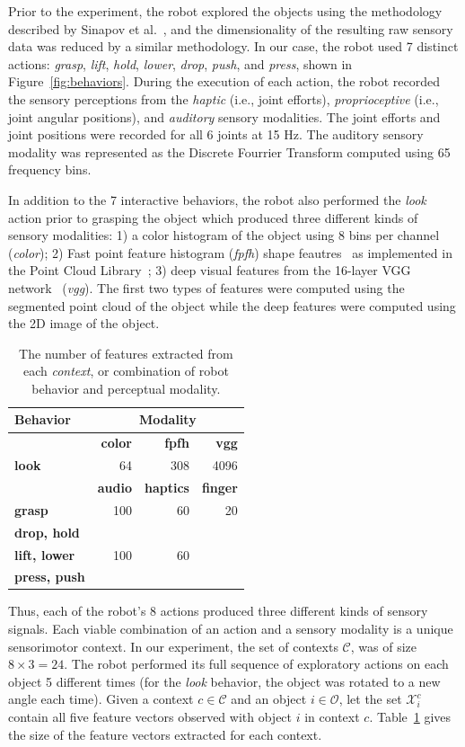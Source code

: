 Prior to the experiment, the robot explored the objects using the methodology described by Sinapov et al.~, and the dimensionality of the resulting raw sensory data was reduced by a similar methodology.
In our case, the robot used 7 distinct actions: {\it grasp}, {\it lift}, {\it hold}, {\it lower}, {\it drop}, {\it push}, and {\it press}, shown in Figure~\ref{fig:behaviors}.
During the execution of each action, the robot recorded the sensory perceptions from the {\it haptic} (i.e., joint efforts), {\it proprioceptive} (i.e., joint angular positions), and {\it auditory} sensory modalities.
The joint efforts and joint positions were recorded for all 6 joints at 15 Hz.
The auditory sensory modality was represented as the Discrete Fourrier Transform computed using 65 frequency bins.

In addition to the 7 interactive behaviors, the robot also performed the {\it look} action prior to grasping the object which produced three different kinds of sensory modalities: 1) a color histogram of the object using 8 bins per channel ({\it color}); 2) Fast point feature histogram ({\it fpfh}) shape feautres~\cite{rusu:icra09} as implemented in the Point Cloud Library~\cite{aldoma:ram12}; 3) deep visual features from the 16-layer VGG network~\cite{simonyan:corr14} ({\it vgg}).
The first two types of features were computed using the segmented point cloud of the object while the deep features were computed using the 2D image of the object. 

\begin{table}
\centering
\begin{tabular}[h]{|l|r|r|r|}
	\hline
	\bf Behavior & \multicolumn{3}{c|}{\bf Modality} \\ \hline \hline
	& \bf color & \bf fpfh & \bf vgg \\ \hline
	\bf look & 64 & 308 & 4096 \\ \hline \hline
	& \bf audio & \bf haptics & \bf finger \\ \hline
	\bf grasp & 100 & 60 & 20 \\ \hline
	\bf drop, hold & & & \\
	\bf lift, lower & 100 & 60 & \\
	\bf press, push & & & \\ \hline
\end{tabular}
\caption{The number of features extracted from each \textit{context}, or combination of robot behavior and perceptual modality.}
\label{tab:feature_space_of_contexts}
\end{table}

Thus, each of the robot's 8 actions produced three different kinds of sensory signals.
Each viable combination of an action and a sensory modality is a unique sensorimotor context.
In our experiment, the set of contexts $\mathcal{C}$, was of size  $8 \times 3 = 24$.
The robot performed its full sequence of exploratory actions on each object 5 different times (for the {\it look} behavior, the object was rotated to a new angle each time). Given a context $c \in \mathcal{C}$ and an object $i \in \mathcal{O}$, let the set $\mathcal{X}_i^c$ contain all five feature vectors observed with object $i$ in context $c$.
Table~\ref{tab:feature_space_of_contexts} gives the size of the feature vectors extracted for each context.